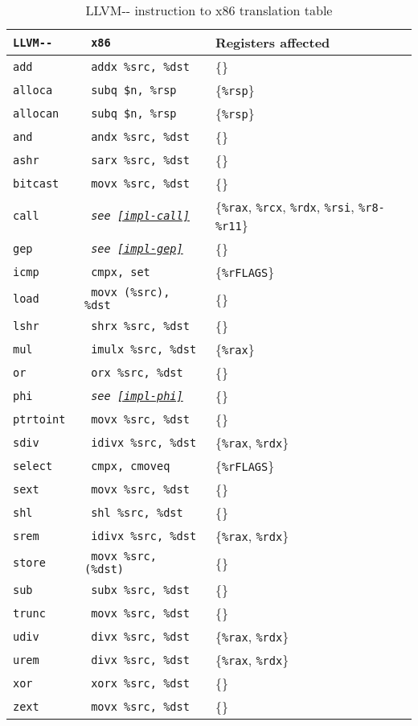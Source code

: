 \documentclass{article}
\begin{document}
\begin{table}[H]
  \centering
\begin{tabular}{|>{\tt}l|>{\tt}l|l|} 
 \hline
 LLVM-{}- & x86 & Registers affected\\
 \hline
add      & addx \%src, \%dst & \{\}\\
alloca   & subq \$n, \%rsp & \{\texttt{\%rsp}\}\\
allocan  & subq \$n, \%rsp & \{\texttt{\%rsp}\}\\
and      & andx \%src, \%dst & \{\}\\
ashr     & sarx \%src, \%dst & \{\}\\
bitcast  & movx \%src, \%dst & \{\}\\
call     & \textrm{\textit{see \ref{impl-call}}} & \{\texttt{\%rax}, \texttt{\%rcx}, \texttt{\%rdx}, \texttt{\%rsi}, \texttt{\%r8-\%r11}\}\\
gep      & \textrm{\textit{see \ref{impl-gep}}} & \{\}\\
icmp     & cmpx, set & \{\texttt{\%rFLAGS}\}\\
load     & movx (\%src), \%dst & \{\}\\
lshr     & shrx \%src, \%dst & \{\}\\
mul      & imulx \%src, \%dst & \{\texttt{\%rax}\}\\
or       & orx \%src, \%dst & \{\}\\
phi      & \textrm{\textit{see \ref{impl-phi}}} & \{\}\\
ptrtoint & movx \%src, \%dst & \{\}\\
sdiv     & idivx \%src, \%dst & \{\texttt{\%rax}, \texttt{\%rdx}\}\\
select   & cmpx, cmoveq & \{\texttt{\%rFLAGS}\}\\
sext     & movx \%src, \%dst & \{\}\\
shl      & shl \%src, \%dst & \{\}\\
srem     & idivx \%src, \%dst & \{\texttt{\%rax}, \texttt{\%rdx}\}\\
store    & movx \%src, (\%dst) & \{\}\\
sub      & subx \%src, \%dst & \{\}\\
trunc    & movx \%src, \%dst & \{\}\\
udiv     & divx \%src, \%dst & \{\texttt{\%rax}, \texttt{\%rdx}\}\\
urem     & divx \%src, \%dst & \{\texttt{\%rax}, \texttt{\%rdx}\}\\
xor      & xorx \%src, \%dst & \{\}\\
zext     & movx \%src, \%dst & \{\}\\
 \hline
\end{tabular}
\caption{LLVM-{}- instruction to x86 translation table}\label{tab:trans}
\end{table}
\end{document}
